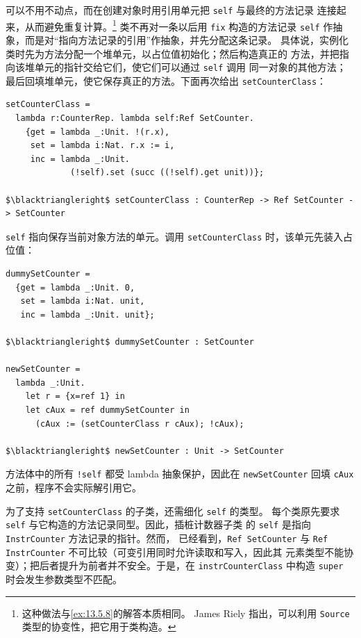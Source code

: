 可以不用不动点，而在创建对象时用引用单元把 \texttt{self} 与最终的方法记录
连接起来，从而避免重复计算。\footnote{这种做法与\cref{ex:13.5.8}的解答本质相同。
James Riely 指出，可以利用 \texttt{Source} 类型的协变性，把它用于类构造。}
类不再对一条以后用 \texttt{fix} 构造的方法记录
\texttt{self} 作抽象，而是对“指向方法记录的引用”作抽象，并先分配这条记录。
具体说，实例化类时先为方法分配一个堆单元，以占位值初始化；然后构造真正的
方法，并把指向该堆单元的指针交给它们，使它们可以通过 \texttt{self} 调用
同一对象的其他方法；最后回填堆单元，使它保存真正的方法。下面再次给出
\texttt{setCounterClass}：

\begin{lstlisting}[mathescape=true]
setCounterClass =
  lambda r:CounterRep. lambda self:Ref SetCounter.
    {get = lambda _:Unit. !(r.x),
     set = lambda i:Nat. r.x := i,
     inc = lambda _:Unit.
             (!self).set (succ ((!self).get unit))};

$\blacktriangleright$ setCounterClass : CounterRep -> Ref SetCounter -> SetCounter
\end{lstlisting}

\texttt{self} 指向保存当前对象方法的单元。调用 \texttt{setCounterClass}
时，该单元先装入占位值：

\begin{lstlisting}[mathescape=true]
dummySetCounter =
  {get = lambda _:Unit. 0,
   set = lambda i:Nat. unit,
   inc = lambda _:Unit. unit};

$\blacktriangleright$ dummySetCounter : SetCounter

newSetCounter =
  lambda _:Unit.
    let r = {x=ref 1} in
    let cAux = ref dummySetCounter in
      (cAux := (setCounterClass r cAux); !cAux);

$\blacktriangleright$ newSetCounter : Unit -> SetCounter
\end{lstlisting}

方法体中的所有 \texttt{!self} 都受 lambda 抽象保护，因此在
\texttt{newSetCounter} 回填 \texttt{cAux} 之前，程序不会实际解引用它。

为了支持 \texttt{setCounterClass} 的子类，还需细化 \texttt{self} 的类型。
每个类原先要求 \texttt{self} 与它构造的方法记录同型。因此，插桩计数器子类
的 \texttt{self} 是指向 \texttt{InstrCounter} 方法记录的指针。然而，
已经看到，\texttt{Ref SetCounter} 与
\texttt{Ref InstrCounter} 不可比较（可变引用同时允许读取和写入，因此其
元素类型不能协变）；把后者提升为前者并不安全。于是，在
\texttt{instrCounterClass} 中构造 \texttt{super} 时会发生参数类型不匹配。

